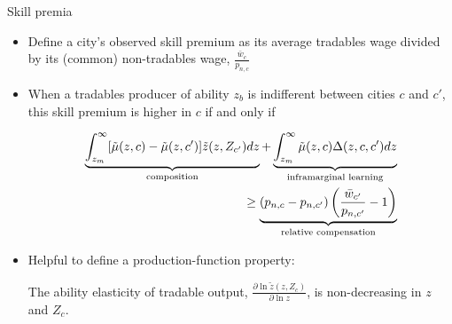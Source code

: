 \documentclass[10pt,notes=hide]{beamer}
\begin{document}
\begin{frame}{Skill premia}
\begin{itemize}
	\item Define a city's observed skill premium as its average tradables wage divided by its (common) non-tradables wage, $\frac{\bar{w}_{c}}{p_{n,c}}$
	\item When a tradables producer of ability $z_b$ is indifferent between cities $c$ and $c'$, this skill premium is higher in $c$ if and only if

\begin{align*} %
\underbrace{\int_{z_m}^{\infty}[\tilde{\mu}(z,c)-\tilde{\mu}(z,c')]\tilde{z}(z,Z_{c'})dz}_{\textnormal{composition}}+\underbrace{\int_{z_m}^{\infty}\tilde{\mu}(z,c)\Delta(z,c,c')dz}_{\textnormal{inframarginal learning}} \\
\geq \underbrace{\left(p_{n,c}-p_{n,c'}\right)\left(\frac{\bar{w}_{c'}}{p_{n,c'}}-1\right)}_{\textnormal{relative compensation}}\label{eqn:premia_decomp}
\end{align*}
	\item Helpful to define a production-function property: 
	\begin{condition}\label{condition:outputelasticity}
	The ability elasticity of tradable output,
	$\frac{\partial\ln\tilde{z}\left(z,Z_{c}\right)}{\partial\ln z}$,
	is non-decreasing in $z$ and $Z_{c}$.
	\end{condition}
\end{itemize}
\end{frame}
\end{document}
